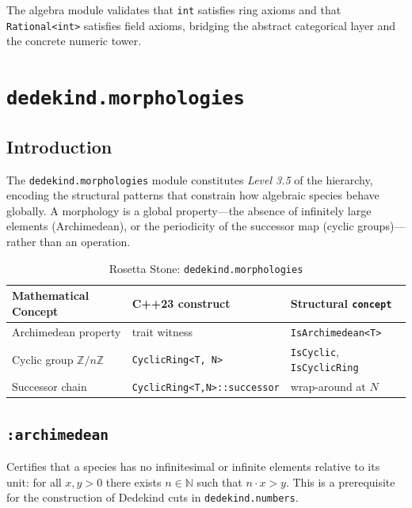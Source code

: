 \documentclass[11pt, a4paper]{report}
\begin{document}
The algebra module validates that \texttt{int} satisfies ring axioms and that \texttt{Rational<int>} satisfies field axioms, bridging the abstract categorical layer and the concrete numeric tower.


\chapter{\texttt{dedekind.morphologies}}
\label{chap:morphologies}

\section{Introduction}

The \texttt{dedekind.morphologies} module constitutes \emph{Level 3.5} of the hierarchy, encoding the structural patterns that constrain how algebraic species behave globally.
A morphology is a global property---the absence of infinitely large elements (Archimedean), or the periodicity of the successor map (cyclic groups)---rather than an operation.

\begin{table}[ht]
\centering
\caption{Rosetta Stone: \texttt{dedekind.morphologies}}
\label{table:morphologies}
\begin{tabular}{lll}
\toprule
\textbf{Mathematical Concept} & \textbf{C++23 construct} & \textbf{Structural \texttt{concept}} \\
\midrule
Archimedean property & trait witness & \texttt{IsArchimedean<T>} \\
Cyclic group $\mathbb{Z}/n\mathbb{Z}$ & \texttt{CyclicRing<T, N>} & \texttt{IsCyclic}, \texttt{IsCyclicRing} \\
Successor chain & \texttt{CyclicRing<T,N>::successor} & wrap-around at $N$ \\
\bottomrule
\end{tabular}
\end{table}

\section{\texttt{:archimedean}}
\label{sec:morphologies-archimedean}

Certifies that a species has no infinitesimal or infinite elements relative to its unit: for all $x, y > 0$ there exists $n \in \mathbb{N}$ such that $n \cdot x > y$.
This is a prerequisite for the construction of Dedekind cuts in \texttt{dedekind.numbers}.
\end{document}
